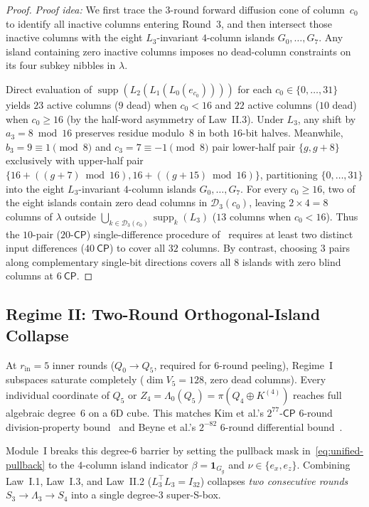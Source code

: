 \documentclass[11pt,a4paper]{article}
\theoremstyle{definition}
\theoremstyle{remark}
\newcommand{\supp}{\operatorname{supp}}
\newcommand{\CP}{\mathsf{CP}}
\begin{document}
\begin{proof}
\emph{Proof idea:} We first trace the $3$-round forward diffusion cone of column~$c_0$ to identify all inactive columns entering Round~$3$, and then intersect those inactive columns with the eight $L_3$-invariant $4$-column islands $G_0, \dots, G_7$. Any island containing zero inactive columns imposes no dead-column constraints on its four subkey nibbles in $\lambda$.

Direct evaluation of $\supp(L_2(L_1(L_0(e_{c_0}))))$ for each $c_0 \in \{0,\dots,31\}$ yields $23$ active columns ($9$ dead) when $c_0 < 16$ and $22$ active columns ($10$ dead) when $c_0 \ge 16$ (by the half-word asymmetry of Law~II.3). Under $L_3$, any shift by $a_3 = 8 \bmod 16$ preserves residue modulo~$8$ in both $16$-bit halves. Meanwhile, $b_3 = 9 \equiv 1 \pmod 8$ and $c_3 = 7 \equiv -1 \pmod 8$ pair lower-half pair $\{g, g+8\}$ exclusively with upper-half pair $\{16+((g+7)\bmod 16), 16+((g+15)\bmod 16)\}$, partitioning $\{0,\dots,31\}$ into the eight $L_3$-invariant $4$-column islands $G_0, \dots, G_7$. For every $c_0 \ge 16$, two of the eight islands contain zero dead columns in $\mathcal{D}_3(c_0)$, leaving $2 \times 4 = 8$ columns of $\lambda$ outside $\bigcup_{k \in \mathcal{D}_3(c_0)}\supp_k(L_3)$ ($13$ columns when $c_0 < 16$). Thus the $10$-pair ($20\text{-}\CP$) single-difference procedure of~\cite[Section~6.2]{BBGHP25} requires at least two distinct input differences ($40~\CP$) to cover all $32$ columns. By contrast, choosing $3$ pairs along complementary single-bit directions covers all $8$ islands with zero blind columns at $6~\CP$.
\end{proof}

\subsection{Regime II: Two-Round Orthogonal-Island Collapse}
\label{subsec:regime2}

At $r_{\text{in}} = 5$ inner rounds ($Q_0 \to Q_5$, required for $6$-round peeling), Regime~I subspaces saturate completely ($\dim V_5 = 128$, zero dead columns). Every individual coordinate of $Q_5$ or $Z_4 = \Lambda_0(Q_5) = \pi(Q_4 \oplus K^{(4)})$ reaches full algebraic degree~$6$ on a $6$D cube. This matches Kim et al.'s $2^{77}\text{-}\CP$ $6$-round division-property bound~\cite{KKL24} and Beyne et al.'s $2^{-82}$ $6$-round differential bound~\cite[Appendix~A]{BNS26}.

Module~I breaks this degree-$6$ barrier by setting the pullback mask in~\eqref{eq:unified-pullback} to the $4$-column island indicator $\beta = \mathbf{1}_{G_g}$ and $\nu \in \{e_x, e_z\}$. Combining Law~I.1, Law~I.3, and Law~II.2 ($L_3^\top L_3 = I_{32}$) collapses \emph{two consecutive rounds} $S_3 \to \Lambda_3 \to S_4$ into a single degree-$3$ super-S-box.
\end{document}
